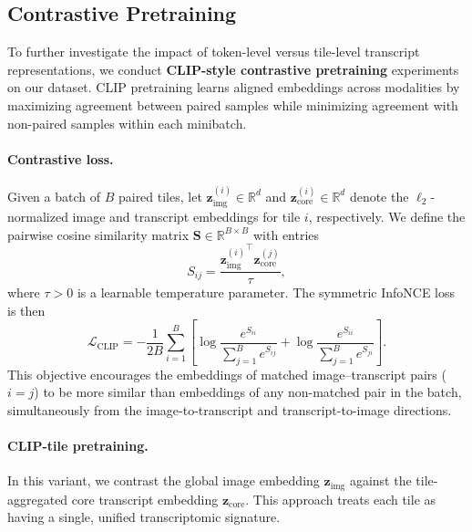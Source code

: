 \subsection*{Contrastive Pretraining}
\label{sec:contrastive-pretraining}

To further investigate the impact of token-level versus tile-level transcript representations, we conduct \textbf{CLIP-style contrastive pretraining} \cite{radford_learningtransferablevisual_2021} experiments on our dataset. CLIP pretraining learns aligned embeddings across modalities by maximizing agreement between paired samples while minimizing agreement with non-paired samples within each minibatch.

\paragraph{Contrastive loss.}
Given a batch of $B$ paired tiles, let $\mathbf{z}_{\text{img}}^{(i)}\in\mathbb{R}^{d}$ and $\mathbf{z}_{\text{core}}^{(i)}\in\mathbb{R}^{d}$ denote the $\ell_2$-normalized image and transcript embeddings for tile $i$, respectively. We define the pairwise cosine similarity matrix $\mathbf{S}\in\mathbb{R}^{B\times B}$ with entries
\begin{equation}
  S_{ij} = \frac{{\mathbf{z}_{\text{img}}^{(i)}}^\top \mathbf{z}_{\text{core}}^{(j)}}{\tau},
\end{equation}
where $\tau > 0$ is a learnable temperature parameter. The symmetric InfoNCE loss is then
\begin{equation}
  \mathcal{L}_{\text{CLIP}} = -\frac{1}{2B}\sum_{i=1}^{B}\left[
    \log \frac{e^{S_{ii}}}{\sum_{j=1}^{B} e^{S_{ij}}}
    +
    \log \frac{e^{S_{ii}}}{\sum_{j=1}^{B} e^{S_{ji}}}
  \right].
  \label{eq:clip-loss}
\end{equation}
This objective encourages the embeddings of matched image--transcript pairs ($i=j$) to be more similar than embeddings of any non-matched pair in the batch, simultaneously from the image-to-transcript and transcript-to-image directions.

\paragraph{CLIP-tile pretraining.}
In this variant, we contrast the global image embedding $\mathbf{z}_{\text{img}}$ against the tile-aggregated core transcript embedding $\mathbf{z}_{\text{core}}$. This approach treats each tile as having a single, unified transcriptomic signature.

